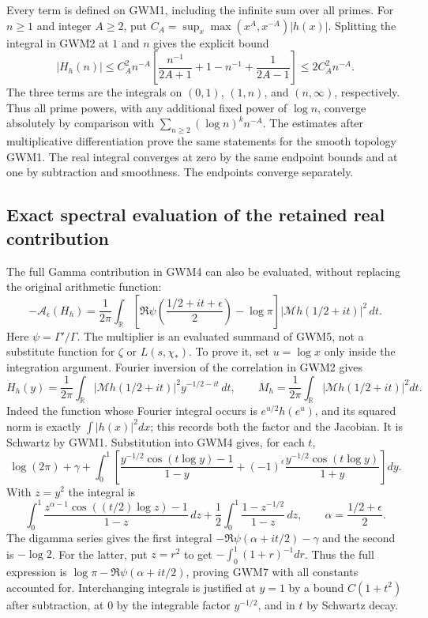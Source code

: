 Every term is defined on GWM1, including the infinite sum over all primes.
For $n\ge1$ and integer $A\ge2$, put
$C_A=\sup_x\max(x^A,x^{-A})|h(x)|$. Splitting the integral in GWM2
at $1$ and $n$ gives the explicit bound
\begin{equation}\tag{GWM6}
 |H_h(n)|\le C_A^2 n^{-A}
 \left[\frac{n^{-1}}{2A+1}+1-n^{-1}+\frac1{2A-1}\right]
 \le2C_A^2 n^{-A}.
\end{equation}
The three terms are the integrals on $(0,1)$, $(1,n)$, and $(n,\infty)$,
respectively. Thus all prime powers, with any additional fixed power of
$\log n$, converge absolutely by comparison with
$\sum_{n\ge2}(\log n)^k n^{-A}$. The estimates after multiplicative
differentiation prove the same statements for the smooth topology GWM1.
The real integral converges at zero by the same endpoint bounds and at
one by subtraction and smoothness. The endpoints converge separately.

\subsection{Exact spectral evaluation of the retained real contribution}

The full Gamma contribution in GWM4 can also be evaluated, without
replacing the original arithmetic function:
\begin{equation}\tag{GWM7}
 -\mathcal A_\epsilon(H_h)=\frac1{2\pi}\int_{\mathbb R}
 \left[\Re\psi\left(\frac{1/2+it+\epsilon}{2}\right)-\log\pi\right]
 |\mathcal Mh(1/2+it)|^2\,dt.
\end{equation}
Here $\psi=\Gamma'/\Gamma$. The multiplier is an evaluated summand
of GWM5, not a substitute function for $\zeta$ or $L(s,\chi_*)$.
To prove it, set $u=\log x$ only inside the integration argument.
Fourier inversion of the correlation in GWM2 gives
\begin{equation}\tag{GWM8}
 H_h(y)=\frac1{2\pi}\int_{\mathbb R}
 |\mathcal Mh(1/2+it)|^2 y^{-1/2-it}\,dt,\qquad
 M_h=\frac1{2\pi}\int_{\mathbb R}|\mathcal Mh(1/2+it)|^2dt.
\end{equation}
Indeed the function whose Fourier integral occurs is
$e^{u/2}h(e^u)$, and its squared norm is exactly
$\int |h(x)|^2dx$; this records both the factor and the Jacobian.
It is Schwartz by GWM1. Substitution into GWM4 gives, for each $t$,
\[
 \log(2\pi)+\gamma+
 \int_0^1\left[
 \frac{y^{-1/2}\cos(t\log y)-1}{1-y}
 +(-1)^\epsilon\frac{y^{-1/2}\cos(t\log y)}{1+y}\right]dy.
\]
With $z=y^2$ the integral is
\[
 \int_0^1\frac{z^{\alpha-1}\cos((t/2)\log z)-1}{1-z}\,dz
 +\frac12\int_0^1\frac{1-z^{-1/2}}{1-z}\,dz,
 \qquad\alpha=\frac{1/2+\epsilon}{2}.
\]
The digamma series gives the first integral
$-\Re\psi(\alpha+it/2)-\gamma$ and the second is $-\log2$.
For the latter, put $z=r^2$ to get $-\int_0^1(1+r)^{-1}dr$.
Thus the full expression is $\log\pi-\Re\psi(\alpha+it/2)$,
proving GWM7 with all constants accounted for. Interchanging integrals
is justified at $y=1$ by a bound $C(1+t^2)$ after subtraction, at $0$
by the integrable factor $y^{-1/2}$, and in $t$ by Schwartz decay.

